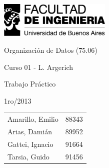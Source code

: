 \begin{titlepage}

\begin{flushleft}
\includegraphics[width=0.4\textwidth]{./Images/logoFiubaCompleto}
\end{flushleft}

\begin{center}
\sffamily
\bfseries
\large

\vspace*{\fill}

Organización de Datos (75.06)


Curso 01 - L. Argerich

\vspace*{\fill}

Trabajo Práctico


1ro/2013

\vspace*{\fill}

\begin{table}[!h]
\normalfont
\centering
\large

\begin{tabular}{l l}
\toprule
Amarillo, Emilio & 88343 \\
Arias, Damián & 89952\\
Gattei, Ignacio & 91664\\
Tarsia, Guido & 91456\\
\bottomrule
\end{tabular}
\end{table}

\vspace*{\fill}

\end{center}
\end{titlepage}